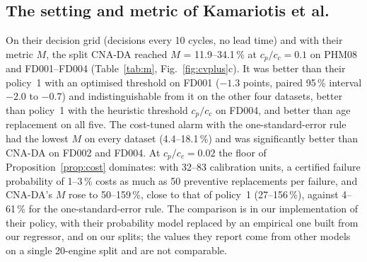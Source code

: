 

\begin{table}[t]\footnotesize\setlength{\tabcolsep}{4pt}
\caption{Mean excess cost over the cheapest policy in each of the 16 lead-time and cost-ratio cells (\%; cross-validation, repetition~0). Rows~1--3 are certified; the others are not. ``CF'': selected on cross-fitted out-of-fold predictions of all training units and applied through the average of the same five fold models as CNA+ (equal information with CNA+); the split policies use 60\,\% of the training units for fitting and 40\,\% for selection.}\label{tab:cost}

\end{table}

\subsection{The setting and metric of Kamariotis et al.}\label{sec:res-m}

On their decision grid (decisions every 10 cycles, no lead time) and with their metric $M$, the split CNA-DA reached $M$ = 11.9--34.1\,\% at $c_p/c_c=0.1$ on PHM08 and FD001--FD004 (Table~\ref{tab:m}, Fig.~\ref{fig:cvplus}c). It was better than their policy~1 with an optimised threshold on FD001 ($-1.3$ points, paired 95\,\% interval $-2.0$ to $-0.7$) and indistinguishable from it on the other four datasets, better than policy~1 with the heuristic threshold $c_p/c_c$ on FD004, and better than age replacement on all five. The cost-tuned alarm with the one-standard-error rule had the lowest $M$ on every dataset (4.4--18.1\,\%) and was significantly better than CNA-DA on FD002 and FD004. At $c_p/c_c=0.02$ the floor of Proposition~\ref{prop:cost} dominates: with 32--83 calibration units, a certified failure probability of 1--3\,\% costs as much as 50 preventive replacements per failure, and CNA-DA's $M$ rose to 50--159\,\%, close to that of policy~1 (27--156\,\%), against 4--61\,\% for the one-standard-error rule. The comparison is in our implementation of their policy, with their probability model replaced by an empirical one built from our regressor, and on our splits; the values they report come from other models on a single 20-engine split and are not comparable.

\begin{table}[t]\footnotesize\setlength{\tabcolsep}{3pt}
\caption{Metric $M$ (\%) in the setting of Kamariotis et al.\ ($\Delta T=10$ cycles, no lead time, $c_p/c_c=0.1$; five-fold cross-validation, repetition~0) and, in brackets, test failures.}\label{tab:m}
\resizebox{\linewidth}{!}{%
}
\end{table}

